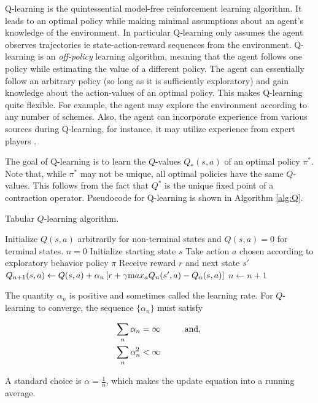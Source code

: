 Q-learning \cite{watkins1992q}  is the quintessential model-free reinforcement learning algorithm. It leads to an optimal policy while making minimal assumptions about an agent's knowledge of the environment. In particular Q-learning only assumes the agent observes trajectories ie state-action-reward sequences from the environment. Q-learning is an {\em off-policy} learning algorithm, meaning that the agent follows one policy while estimating the value of a different policy. The agent can essentially follow an arbitrary policy (so long as it is sufficiently exploratory) and gain knowledge about the action-values of an optimal policy. This makes Q-learning quite flexible. For example, the agent may explore the environment according to any number of schemes. Also, the agent can incorporate experience from various sources during Q-learning, for instance, it may utilize experience from expert players \cite{schaal1997learning, guo2018faster}. 

The goal of Q-learning is to learn the $Q$-values $Q_*(s,a)$ of an optimal policy $\pi^*$. Note that, while $\pi^*$ may not be unique, all optimal policies have the same $Q$-values. This follows from the fact that $Q^*$ is the unique fixed point of a contraction operator. Pseudocode for Q-learning is shown in Algorithm \ref{alg:Q}.

\begin{algorithm}
\caption{Tabular $Q$-learning algorithm.}
\begin{algorithmic}
\STATE Initialize $Q(s,a)$ arbitrarily for non-terminal states and $Q(s,a)=0$ for terminal states.
\STATE $n=0$
\STATE Initialize starting state $s$
\STATE Take action $a$ chosen according to exploratory behavior policy $\pi$
\STATE Receive reward $r$ and next state $s'$
\STATE $Q_{n+1}(s,a) \leftarrow Q(s,a) + \alpha_n \left[ r + \gamma {\text max}_a Q_n(s', a) - Q_n(s,a)   \right]$
\STATE $n \leftarrow n +1$
\ENDWHILE
\ENDWHILE
\end{algorithmic}
\label{alg:Q}
\end{algorithm}

The quantity $\alpha_n$ is positive and sometimes called the learning rate. For $Q$-learning to converge, the sequence $\{\alpha_n\}$ must satisfy

\begin{align*}
&\sum_n \alpha_n = \infty \text{ \hspace{.3in} and, }\\
&\sum_n \alpha_n^2 < \infty
\end{align*}

A standard choice is $\alpha = \frac{1}{n}$, which makes the update equation into a running average.


















